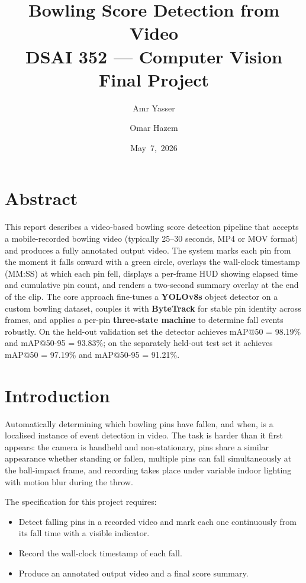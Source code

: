 \documentclass[11pt,a4paper]{article}
\title{Bowling Score Detection from Video \\
       \large DSAI 352 --- Computer Vision Final Project}
\author{Amr Yasser \and Omar Hazem}
\date{May~7,~2026}
\begin{document}
\maketitle
\tableofcontents
\newpage

\section{Abstract}

This report describes a video-based bowling score detection pipeline that accepts a mobile-recorded bowling video (typically 25--30 seconds, MP4 or MOV format) and produces a fully annotated output video. The system marks each pin from the moment it falls onward with a green circle, overlays the wall-clock timestamp (MM:SS) at which each pin fell, displays a per-frame HUD showing elapsed time and cumulative pin count, and renders a two-second summary overlay at the end of the clip. The core approach fine-tunes a \textbf{YOLOv8s} object detector on a custom bowling dataset, couples it with \textbf{ByteTrack} for stable pin identity across frames, and applies a per-pin \textbf{three-state machine} to determine fall events robustly. On the held-out validation set the detector achieves mAP@50 = 98.19\% and mAP@50-95 = 93.83\%; on the separately held-out test set it achieves mAP@50 = 97.19\% and mAP@50-95 = 91.21\%.

\section{Introduction}

Automatically determining which bowling pins have fallen, and when, is a localised instance of event detection in video. The task is harder than it first appears: the camera is handheld and non-stationary, pins share a similar appearance whether standing or fallen, multiple pins can fall simultaneously at the ball-impact frame, and recording takes place under variable indoor lighting with motion blur during the throw.

The specification for this project requires:
\begin{itemize}
  \item Detect falling pins in a recorded video and mark each one continuously from its fall time with a visible indicator.
  \item Record the wall-clock timestamp of each fall.
  \item Produce an annotated output video and a final score summary.
\end{itemize}
\end{document}
